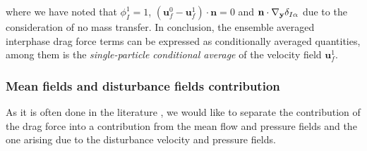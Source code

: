 where we have noted that $\phi_I^1 = 1$,  $(\textbf{u}_f^0 - \textbf{u}_f^1)\cdot \textbf{n} = 0$ and $\textbf{n} \cdot {\mathbf{\nabla}_\textbf{y}} \delta_{I\alpha}$ due to the consideration of no mass transfer. 
In conclusion, the ensemble averaged interphase drag force terms can be expressed as conditionally averaged quantities, among them is the \textit{single-particle conditional average} of the velocity field $\textbf{u}_f^1$. 


\subsubsection{Mean fields and disturbance fields contribution}

As it is often done in the literature \citep{zhang1994ensemble}, we would like to separate the contribution of the drag force into a contribution from the mean flow and pressure fields and the one arising due to the disturbance velocity and pressure fields.  


